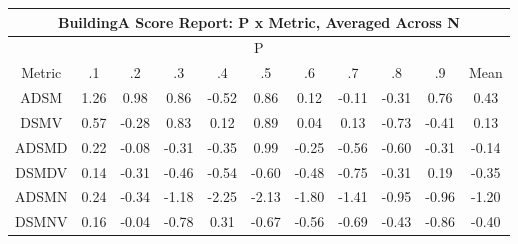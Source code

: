 \begin{longtable}{ | c || c | c | c | c | c | c | c | c | c || c |}
\hline
\multicolumn{11}{|c|}{ BuildingA Score Report: P x Metric, Averaged Across N } \\
\hline
\multicolumn{11}{|c|}{ P } \\
\hline
Metric & .1 & .2 & .3 & .4 & .5 & .6 & .7 & .8 & .9 & Mean\\
\hline
\hline
\endhead
ADSM &  \cellcolor[HTML]{DFDFFF} 1.26 &  \cellcolor[HTML]{E7E7FF} 0.98 &  \cellcolor[HTML]{E7E7FF} 0.86 &  \cellcolor[HTML]{FFEFEF} -0.52 &  \cellcolor[HTML]{E7E7FF} 0.86 &  \cellcolor[HTML]{FFFFFF} 0.12 &  \cellcolor[HTML]{FFFFFF} -0.11 &  \cellcolor[HTML]{FFF7F7} -0.31 &  \cellcolor[HTML]{EFEFFF} 0.76 &  \cellcolor[HTML]{F7F7FF} 0.43 \\
DSMV &  \cellcolor[HTML]{EFEFFF} 0.57 &  \cellcolor[HTML]{FFF7F7} -0.28 &  \cellcolor[HTML]{E7E7FF} 0.83 &  \cellcolor[HTML]{FFFFFF} 0.12 &  \cellcolor[HTML]{E7E7FF} 0.89 &  \cellcolor[HTML]{FFFFFF} 0.04 &  \cellcolor[HTML]{FFFFFF} 0.13 &  \cellcolor[HTML]{FFEFEF} -0.73 &  \cellcolor[HTML]{FFF7F7} -0.41 &  \cellcolor[HTML]{FFFFFF} 0.13 \\
ADSMD &  \cellcolor[HTML]{F7F7FF} 0.22 &  \cellcolor[HTML]{FFFFFF} -0.08 &  \cellcolor[HTML]{FFF7F7} -0.31 &  \cellcolor[HTML]{FFF7F7} -0.35 &  \cellcolor[HTML]{E7E7FF} 0.99 &  \cellcolor[HTML]{FFF7F7} -0.25 &  \cellcolor[HTML]{FFEFEF} -0.56 &  \cellcolor[HTML]{FFEFEF} -0.60 &  \cellcolor[HTML]{FFF7F7} -0.31 &  \cellcolor[HTML]{FFFFFF} -0.14 \\
DSMDV &  \cellcolor[HTML]{FFFFFF} 0.14 &  \cellcolor[HTML]{FFF7F7} -0.31 &  \cellcolor[HTML]{FFF7F7} -0.46 &  \cellcolor[HTML]{FFEFEF} -0.54 &  \cellcolor[HTML]{FFEFEF} -0.60 &  \cellcolor[HTML]{FFF7F7} -0.48 &  \cellcolor[HTML]{FFEFEF} -0.75 &  \cellcolor[HTML]{FFF7F7} -0.31 &  \cellcolor[HTML]{F7F7FF} 0.19 &  \cellcolor[HTML]{FFF7F7} -0.35 \\
ADSMN &  \cellcolor[HTML]{F7F7FF} 0.24 &  \cellcolor[HTML]{FFF7F7} -0.34 &  \cellcolor[HTML]{FFDFDF} -1.18 &  \cellcolor[HTML]{FFC7C7} -2.25 &  \cellcolor[HTML]{FFC7C7} -2.13 &  \cellcolor[HTML]{FFCFCF} -1.80 &  \cellcolor[HTML]{FFDFDF} -1.41 &  \cellcolor[HTML]{FFE7E7} -0.95 &  \cellcolor[HTML]{FFE7E7} -0.96 &  \cellcolor[HTML]{FFDFDF} -1.20 \\
DSMNV &  \cellcolor[HTML]{F7F7FF} 0.16 &  \cellcolor[HTML]{FFFFFF} -0.04 &  \cellcolor[HTML]{FFEFEF} -0.78 &  \cellcolor[HTML]{F7F7FF} 0.31 &  \cellcolor[HTML]{FFEFEF} -0.67 &  \cellcolor[HTML]{FFEFEF} -0.56 &  \cellcolor[HTML]{FFEFEF} -0.69 &  \cellcolor[HTML]{FFF7F7} -0.43 &  \cellcolor[HTML]{FFE7E7} -0.86 &  \cellcolor[HTML]{FFF7F7} -0.40 \\

\end{longtable}
